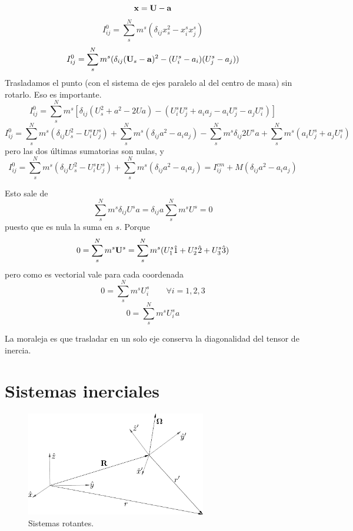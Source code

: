 \documentclass[10pt,oneside]{CBFT_book}
\begin{document}
\[
	\vb{x} = \vb{U} - \vb{a}  
\]
\[
	I_{ij}^0 = \sum_s^N m^s ( \delta_{ij} x_s^2 - x_i^s x_j^s )
\]
\[
	I_{ij}^0 = \sum_s^N m^s ( \delta_{ij} ( \vb{U}_s - \vb{a} )^2 - (U^s_i - a_i) ( U^s_j - a_j ) )
\]
Trasladamos el punto (con el sistema de ejes paralelo al del centro de masa) sin rotarlo. Eso es importante.
\[
	I_{ij}^0 = \sum_s^N m^s \left[  \delta_{ij} ( U_s^2 + a^2 - 2Ua ) -
			( U^s_iU^s_j + a_i a_j - a_i U^s_j - a_j U^s_i ) \right]
\]
\[
	I_{ij}^0 = \sum_s^N m^s ( \delta_{ij} U_s^2 - U^s_iU^s_j ) + \sum_s^N m^s ( \delta_{ij} a^2 - a_i a_j )
			- \sum_s^N m^s \delta_{ij} 2 U^s a  + \sum_s^N m^s ( a_i U^s_j + a_j U^s_i )
\]
pero las dos últimas sumatorias son nulas, y
\[
	I_{ij}^0 = \sum_s^N m^s ( \delta_{ij} U_s^2 - U^s_iU^s_j ) + \sum_s^N m^s ( \delta_{ij} a^2 - a_i a_j )
		= I_{ij}^{cm}  + M ( \delta_{ij} a^2 - a_i a_j )
\]

Esto sale de
\[
	\sum_s^N m^s \delta_{ij} U^s a = \delta_{ij} a \sum_s^N m^s  U^s  = 0
\]
puesto que es nula la suma en $s$. Porque 
\[
	0 = \sum_s^N m^s \vb{U}^s = \sum_s^N m^s ( U_1^s \hat{1} + U_2^s \hat{2} + U_3^s \hat{3} )
\]
pero como es vectorial vale para cada coordenada 
\[
	0 = \sum_s^N m^s U_i^s \qquad \forall i=1,2,3
\]
\[
	0 = \sum_s^N m^s U_i^s a
\]

La moraleja es que trasladar en un solo eje conserva la diagonalidad del tensor de inercia.

\section{Sistemas inerciales}

\begin{figure}
	\begin{center}
	\includegraphics[width=0.7\textwidth]{images/fig_sist_rotantes.pdf}	 
	\end{center}
	\caption{Sistemas rotantes.}
\end{figure} 
\end{document}
